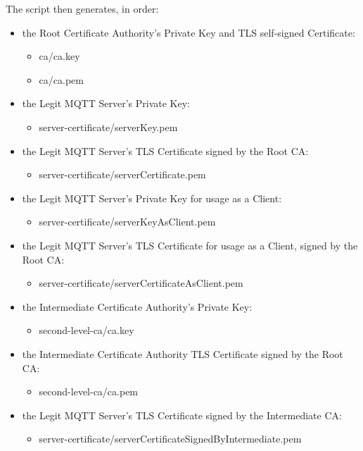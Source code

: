 \documentclass[binding=0.6cm,noexaminfo]{sapthesis}
\begin{document}
The script then generates, in order:
\begin{itemize}
	\item the Root Certificate Authority's Private Key and TLS self-signed Certificate:
	\begin{itemize}
		\item ca/ca.key
		\item ca/ca.pem
	\end{itemize}
	\item the Legit MQTT Server's Private Key:
	\begin{itemize}
		\item server-certificate/serverKey.pem
	\end{itemize}
	\item the Legit MQTT Server's TLS Certificate signed by the Root CA:
	\begin{itemize}
		\item server-certificate/serverCertificate.pem
	\end{itemize}
	\item the Legit MQTT Server's Private Key for usage as a Client:
	\begin{itemize}
		\item server-certificate/serverKeyAsClient.pem
	\end{itemize}
	\item the Legit MQTT Server's TLS Certificate for usage as a Client, signed by the Root CA:
	\begin{itemize}
		\item server-certificate/serverCertificateAsClient.pem
	\end{itemize}
	\item the Intermediate Certificate Authority's Private Key:
	\begin{itemize}
		\item second-level-ca/ca.key
	\end{itemize}
	\item the Intermediate Certificate Authority TLS Certificate signed by the Root CA:
	\begin{itemize}
		\item second-level-ca/ca.pem
	\end{itemize}
	\item the Legit MQTT Server's TLS Certificate signed by the Intermediate CA:
	\begin{itemize}
		\item server-certificate/serverCertificateSignedByIntermediate.pem
	\end{itemize}

\end{itemize}
\end{document}
